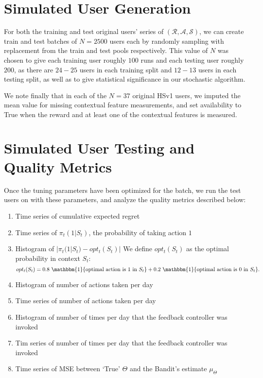 \section{Simulated User Generation}
\label{Simulated User Generation}

For both the training and test original users' series of $(\mathcal{R}, \mathcal{A}, \mathcal{S})$, we can create train and test batches of $N = 2500$ users each by randomly sampling with replacement from the train and test pools respectively.  This value of $N$ was chosen to give each training user roughly $100$ runs and each testing user roughly $200$, as there are $24-25$ users in each training split and $12-13$ users in each testing split, as well as to give statistical significance in our stochastic algorithm.

We note finally that in each of the $N = 37$ original HSv1 users, we imputed the mean value for missing contextual feature measurements, and set availability to True when the reward and at least one of the contextual features is measured.



\section{Simulated User Testing and Quality Metrics}

Once the tuning parameters have been optimized for the batch, we run the test users on with these parameters, and analyze the quality metrics described below:

\begin{enumerate}
	\item Time series of cumulative expected regret
	\item Time series of $\pi_t(1 | S_t)$, the probability of taking action $1$
	\item Histogram of $|\pi_t(1 | S_t) - opt_t(S_t)|$
	\subitem We define $opt_t(S_t)$ as the optimal probability in context $S_t$:
	\begin{equation}
	\label{opt equation}
		opt_t(S_t) = 0.8\ \mathbbm{1}\{\text{optimal action is $1$ in $S_t$}\} + 0.2\ \mathbbm{1}\{\text{optimal action is $0$ in $S_t$}\} .
	\end{equation}
	\item Histogram of number of actions taken per day
	\item Time series of number of actions taken per day
	\item Histogram of number of times per day that the feedback controller was invoked
	\item Tim series of number of times per day that the feedback controller was invoked
	\item Time series of MSE between `True' $\Theta$ and the Bandit's estimate $\mu_\Theta$
\end{enumerate}


